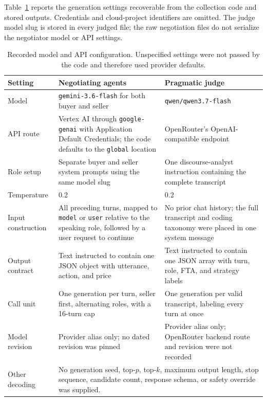 \documentclass{article}
\begin{document}
Table~\ref{tab:model-config} reports the generation settings recoverable from
the collection code and stored outputs. Credentials and cloud-project
identifiers are omitted. The judge model slug is stored in every judged file;
the raw negotiation files do not serialize the negotiator model or API
settings.

\begin{table}[ht]
\caption{Recorded model and API configuration. Unspecified settings were not
passed by the code and therefore used provider defaults.}
\label{tab:model-config}
\centering
\small
\setlength{\tabcolsep}{4pt}
\begin{tabular}{p{.18\linewidth}p{.36\linewidth}p{.36\linewidth}}
\toprule
Setting & Negotiating agents & Pragmatic judge \\
\midrule
Model & \texttt{gemini-3.6-flash} for both buyer and seller &
\texttt{qwen/qwen3.7-flash} \\
API route & Vertex AI through \texttt{google-genai} with Application Default
Credentials; the code defaults to the \texttt{global} location & OpenRouter's
OpenAI-compatible endpoint \\
Role setup & Separate buyer and seller system prompts using the same model
slug & One discourse-analyst instruction containing the complete transcript \\
Temperature & 0.2 & 0.2 \\
Input construction & All preceding turns, mapped to \texttt{model} or
\texttt{user} relative to the speaking role, followed by a user request to
continue & No prior chat history; the full transcript and coding taxonomy were
placed in one system message \\
Output contract & Text instructed to contain one JSON object with utterance,
action, and price & Text instructed to contain one JSON array with turn, role,
FTA, and strategy labels \\
Call unit & One generation per turn, seller first, alternating roles, with a
16-turn cap & One generation per valid transcript, labeling every turn at once \\
Model revision & Provider alias only; no dated revision was pinned & Provider
alias only; OpenRouter backend route and revision were not recorded \\
Other decoding & \multicolumn{2}{p{.72\linewidth}}{No generation seed,
top-$p$, top-$k$, maximum output length, stop sequence, candidate count,
response schema, or safety override was supplied.} \\
\bottomrule
\end{tabular}
\end{table}
\end{document}
